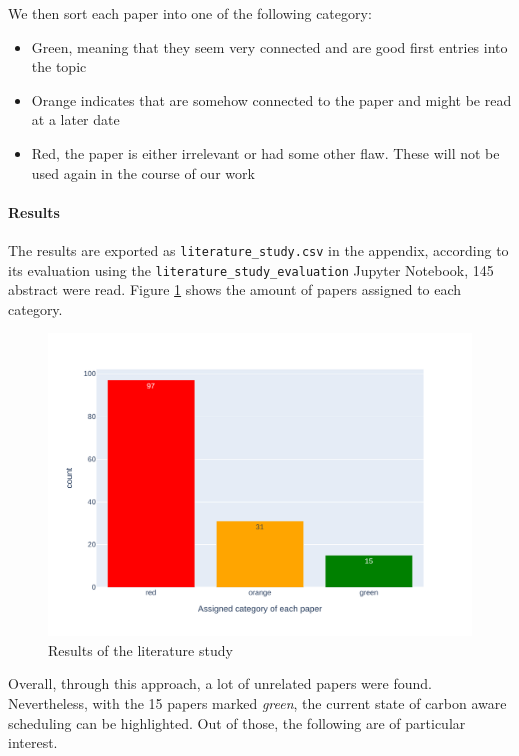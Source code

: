 We then sort each paper into one of the following category:

\begin{itemize}
    \item Green, meaning that they seem very connected and are good first entries into the topic
    \item Orange indicates that are somehow connected to the paper and might be read at a later date
    \item Red, the paper is either irrelevant or had some other flaw. These will not be used again in the course of our work
\end{itemize}

\paragraph{Results}

The results are exported as \verb|literature_study.csv| in the appendix, according to its evaluation using the \verb|literature_study_evaluation| Jupyter Notebook, 145 abstract were read. 
Figure \ref{fig:literature_study} shows the amount of papers assigned to each category.

\begin{figure}
    \includegraphics[width=\linewidth]{literaturrecherche/literature_study.pdf}
    \caption[short]{Results of the literature study}
    \label{fig:literature_study}
\end{figure}

Overall, through this approach, a lot of unrelated papers were found.
Nevertheless, with the 15 papers marked \emph{green}, the current state of carbon aware scheduling can be highlighted.
Out of those, the following are of particular interest.

